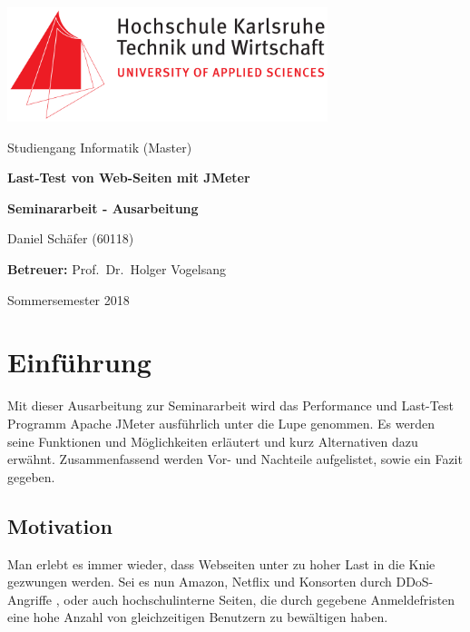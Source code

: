 \documentclass[a4paper,12pt]{article}
\author{Daniel Sch\"afer} \let\Author\@author
\begin{document}
\begin{titlepage}
	\centering
	\includegraphics[width=0.7\textwidth]{bilder/hskalogo}\par\vspace{1cm}
	\vspace{0.5cm}
	{\Large Studiengang Informatik (Master)}\par
	\vspace{2cm}
	{\huge\bfseries Last-Test von Web-Seiten mit JMeter}\par
	\vspace{2cm}
	{\Large\bfseries Seminararbeit - Ausarbeitung}\par
	\vspace{0.5cm}
	\vspace{3cm}
	
	{\Large Daniel Schäfer (60118)\par}
	\vspace{1cm}
	{\Large\textbf{Betreuer:} Prof.~Dr.~Holger Vogelsang} 
	\vfill
	{\Large Sommersemester 2018\par}
	\vfill
\end{titlepage}

\setcounter{page}{2}
\thispagestyle{empty}
\tableofcontents
\pagebreak

\setcounter{page}{4}

\section{Einführung}
Mit dieser Ausarbeitung zur Seminararbeit wird das Performance und Last-Test Programm Apache JMeter ausführlich unter die Lupe genommen. Es werden seine Funktionen und Möglichkeiten erläutert und kurz Alternativen dazu erwähnt. Zusammenfassend werden Vor- und Nachteile aufgelistet, sowie ein Fazit gegeben.

\subsection{Motivation}
Man erlebt es immer wieder, dass Webseiten unter zu hoher Last in die Knie gezwungen werden. Sei es nun Amazon, Netflix und Konsorten durch DDoS-Angriffe \cite{online:AmazonDDoS}, oder auch hochschulinterne Seiten, die durch gegebene Anmeldefristen eine hohe Anzahl von gleichzeitigen Benutzern zu bewältigen haben. 
\end{document}
